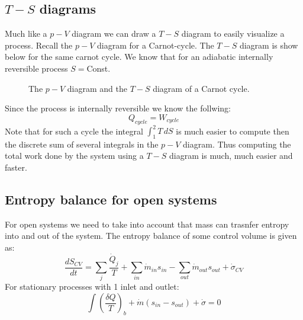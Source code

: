 \documentclass[11pt, a4paper]{article}
\begin{document}
\subsection{$T-S$ diagrams}
Much like a $p-V$ diagram we can draw a $T-S$ diagram to easily visualize a process. Recall the $p-V$ diagram for a Carnot-cycle. The $T-S$ diagram is show below for the same carnot cycle. We know that for an adiabatic internally reversible process $S=$Const.
\begin{figure}[h]
  \centering
  \qquad
  \caption{The $p-V$ diagram and the $T-S$ diagram of a Carnot cycle.}
\end{figure}
Since the process is internally reversible we know the follwing:
\begin{equation}
  Q_{cycle} = W_{cycle}
\end{equation}
Note that for such a cycle the integral $\int_1^2 T\,dS$ is much easier to compute then the discrete sum of several integrals in the $p-V$ diagram. Thus computing the total work done by the system using a $T-S$ diagram is much, much easier and faster.


\subsection{Entropy balance for open systems}
For open systems we need to take into account that mass can trasnfer entropy into and out of the system. The entropy balance of some control volume is given as:
\begin{equation}
  \frac{dS_{CV}}{dt} = \sum_j \frac{\dot{Q}_j}{T} + \sum_{in} \dot{m}_{in}s_{in} - \sum_{out} \dot{m}_{out}s_{out} + \dot{\sigma}_{CV}
\end{equation}
For stationary processes with 1 inlet and outlet:
\begin{equation}
  \int\left(\frac{\delta Q}{T}\right)_b + \dot{m}(s_{in} - s_{out}) + \dot{\sigma} = 0
\end{equation}
\end{document}
